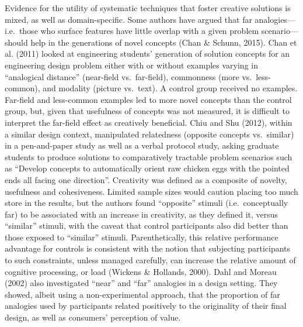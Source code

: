 \documentclass[english,man]{apa6}
\newcounter{author}
\begin{document}
Evidence for the utility of systematic techniques that foster creative
solutions is mixed, as well as domain-specific. Some authors have argued
that far analogies---i.e.~those who surface features have little overlap
with a given problem scenario---should help in the generations of novel
concepts (Chan \& Schunn, 2015). Chan et al. (2011) looked at
engineering students' generation of solution concepts for an engineering
design problem either with or without examples varying in
\enquote{analogical distance} (near-field vs.~far-field), commonness
(more vs.~less-common), and modality (picture vs.~text). A control group
received no examples. Far-field and less-common examples led to more
novel concepts than the control group, but, given that usefulness of
concepts was not measured, it is difficult to interpret the far-field
effect as creatively beneficial. Chiu and Shu (2012), within a similar
design context, manipulated relatedness (opposite concepts vs.~similar)
in a pen-and-paper study as well as a verbal protocol study, asking
graduate students to produce solutions to comparatively tractable
problem scenarios such as \enquote{Develop concepts to automatically
orient raw chicken eggs with the pointed ends all facing one direction}.
Creativity was defined as a composite of novelty, usefulness and
cohesiveness. Limited sample sizes would caution placing too much store
in the results, but the authors found \enquote{opposite} stimuli
(i.e.~conceptually far) to be associated with an increase in creativity,
as they defined it, versus \enquote{similar} stimuli, with the caveat
that control participants also did better than those exposed to
\enquote{similar} stimuli. Parenthetically, this relative performance
advantage for controls is consistent with the notion that subjecting
participants to such constraints, unless managed carefully, can increase
the relative amount of cognitive processing, or load (Wickens \&
Hollands, 2000). Dahl and Moreau (2002) also investigated \enquote{near}
and \enquote{far} analogies in a design setting. They showed, albeit
using a non-experimental approach, that the proportion of far analogies
used by participants related positively to the originality of their
final design, as well as consumers' perception of value.
\end{document}
